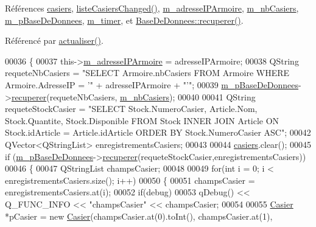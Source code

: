 Références \hyperlink{class_casiers_ad8fba25144a82ba49b2cd2490dcf975b}{casiers}, \hyperlink{class_casiers_a25d7a8e09435cb7ee0b9f9e27e52b177}{liste\+Casiers\+Changed()}, \hyperlink{class_casiers_af745ce1cdce8dce725444e19437e0155}{m\+\_\+adresse\+I\+P\+Armoire}, \hyperlink{class_casiers_a7c4b1df1f2e320c22489234fee991f18}{m\+\_\+nb\+Casiers}, \hyperlink{class_casiers_ae6ac6b09a5cffe28291fc9b3289ff011}{m\+\_\+p\+Base\+De\+Donnees}, \hyperlink{class_casiers_a2e2ee8b7f70d1c22acca56257d257ae6}{m\+\_\+timer}, et \hyperlink{class_base_de_donnees_a77539baad389f5acf754cd2cd452403e}{Base\+De\+Donnees\+::recuperer()}.



Référencé par \hyperlink{class_casiers_a53ff5feefb50f5010943c94916be060f}{actualiser()}.


\begin{DoxyCode}
00036 \{
00037     this->\hyperlink{class_casiers_af745ce1cdce8dce725444e19437e0155}{m\_adresseIPArmoire} = adresseIPArmoire;
00038     QString requeteNbCasiers = \textcolor{stringliteral}{"SELECT Armoire.nbCasiers FROM Armoire WHERE Armoire.AdresseIP = '"} + 
      adresseIPArmoire + \textcolor{stringliteral}{"'"};
00039     \hyperlink{class_casiers_ae6ac6b09a5cffe28291fc9b3289ff011}{m\_pBaseDeDonnees}->\hyperlink{class_base_de_donnees_a77539baad389f5acf754cd2cd452403e}{recuperer}(requeteNbCasiers,
      \hyperlink{class_casiers_a7c4b1df1f2e320c22489234fee991f18}{m\_nbCasiers});
00040 
00041     QString requeteStockCasier = \textcolor{stringliteral}{"SELECT Stock.NumeroCasier, Article.Nom, Stock.Quantite, Stock.Disponible
       FROM Stock INNER JOIN Article ON Stock.idArticle = Article.idArticle ORDER BY Stock.NumeroCasier ASC"};
00042     QVector<QStringList> enregistrementsCasiers;
00043 
00044     \hyperlink{class_casiers_ad8fba25144a82ba49b2cd2490dcf975b}{casiers}.clear();
00045     \textcolor{keywordflow}{if} (\hyperlink{class_casiers_ae6ac6b09a5cffe28291fc9b3289ff011}{m\_pBaseDeDonnees}->\hyperlink{class_base_de_donnees_a77539baad389f5acf754cd2cd452403e}{recuperer}(requeteStockCasier,enregistrementsCasiers))
00046     \{
00047         QStringList champsCasier;
00048 
00049         \textcolor{keywordflow}{for}(\textcolor{keywordtype}{int} i = 0; i < enregistrementsCasiers.size(); i++)
00050         \{
00051             champsCasier = enregistrementsCasiers.at(i);
00052             \textcolor{keywordflow}{if}(debug)
00053                 qDebug() << Q\_FUNC\_INFO << \textcolor{stringliteral}{"champsCasier"} << champsCasier;
00054 
00055             \hyperlink{class_casier}{Casier} *pCasier = \textcolor{keyword}{new} \hyperlink{class_casier}{Casier}(champsCasier.at(0).toInt(), champsCasier.at(1), 

\end{DoxyCode}
